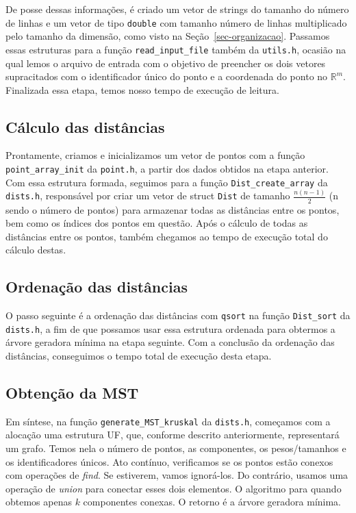 De posse dessas informações, é criado um vetor de strings do tamanho do número de linhas e um vetor de tipo \texttt{double} com tamanho número de linhas multiplicado pelo tamanho da dimensão, como visto na Seção~\ref{sec-organizacao}.
Passamos essas estruturas para a função \texttt{read\_input\_file} também da \texttt{utils.h}, ocasião na qual lemos o arquivo de entrada com o objetivo de preencher os dois vetores supracitados com o identificador único do ponto e a coordenada do ponto no $\mathbb{R}^m$. Finalizada essa etapa, temos nosso tempo de execução de leitura.

\subsection{Cálculo das distâncias}
Prontamente, criamos e inicializamos um vetor de pontos com a função\\ \texttt{point\_array\_init} da \texttt{point.h}, a partir dos dados obtidos na etapa anterior. Com essa estrutura formada, seguimos para a função \texttt{Dist\_create\_array} da \texttt{dists.h}, responsável por criar um vetor de struct \texttt{Dist} de tamanho $\frac{n (n - 1)}{2}$ (n sendo o número de pontos) para armazenar todas as distâncias entre os pontos, bem como os índices dos pontos em questão. Após o cálculo de todas as distâncias entre os pontos, também chegamos ao tempo de execução total do cálculo destas.

\subsection{Ordenação das distâncias}
O passo seguinte é a ordenação das distâncias com \texttt{qsort} na função \texttt{Dist\_sort} da \texttt{dists.h}, a fim de que possamos usar essa estrutura ordenada para obtermos a árvore geradora mínima na etapa seguinte. Com a conclusão da ordenação das distâncias, conseguimos o tempo total de execução desta etapa.

\subsection{Obtenção da MST}
Em síntese, na função \texttt{generate\_MST\_kruskal} da \texttt{dists.h}, começamos com a alocação uma estrutura UF, que, conforme descrito anteriormente, representará um grafo. Temos nela o número de pontos, as componentes, os pesos/tamanhos e os identificadores únicos. Ato contínuo, verificamos se os pontos estão conexos com operações de \emph{find}. Se estiverem, vamos ignorá-los. Do contrário, usamos uma operação de \emph{union} para conectar esses dois elementos. O algoritmo para quando obtemos apenas $k$ componentes conexas. O retorno é a árvore geradora mínima.

